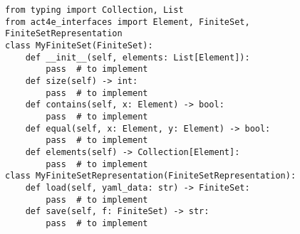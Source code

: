 \par\begin{minipage}{72ex}
\begin{verbatim}
from typing import Collection, List
from act4e_interfaces import Element, FiniteSet, FiniteSetRepresentation
class MyFiniteSet(FiniteSet):
    def __init__(self, elements: List[Element]):
        pass  # to implement
    def size(self) -> int:
        pass  # to implement
    def contains(self, x: Element) -> bool:
        pass  # to implement
    def equal(self, x: Element, y: Element) -> bool:
        pass  # to implement
    def elements(self) -> Collection[Element]:
        pass  # to implement
class MyFiniteSetRepresentation(FiniteSetRepresentation):
    def load(self, yaml_data: str) -> FiniteSet:
        pass  # to implement
    def save(self, f: FiniteSet) -> str:
        pass  # to implement
\end{verbatim}
\end{minipage}\par